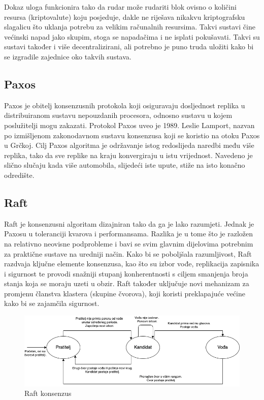\documentclass[times, utf8, diplomski]{fer}
\begin{document}
Dokaz uloga funkcionira tako da rudar može rudariti blok ovisno o količini resursa (kriptovalute) koju posjeduje, dakle ne riješava nikakvu kriptografsku slagalicu što uklanja potrebu za velikim računalnih resursima. Takvi sustavi čine većinski napad jako skupim, stoga se napadačima i ne isplati pokušavati. Takvi su sustavi također i više decentralizirani, ali potrebno je puno truda uložiti kako bi se izgradile zajednice oko takvih sustava.

\subsection{Paxos}

Paxos je obitelj konsenzusnih protokola koji osiguravaju dosljednost replika u distribuiranom sustavu nepouzdanih procesora, odnosno sustavu u kojem poslužitelji mogu zakazati. Protokol Paxos uveo je 1989. Leslie Lamport, nazvan po izmišljenom zakonodavnom sustavu konsenzusa koji se koristio na otoku Paxos u Grčkoj. Cilj Paxos algoritma je održavanje istog redoslijeda naredbi među više replika, tako da sve replike na kraju konvergiraju u istu vrijednost. Navedeno je slično slučaju kada više automobila, slijedeći iste upute, stiže na isto konačno odredište. \cite{lamport2001paxos}

\subsection{Raft}
\label{sec:raft}
Raft je konsenzusni algoritam dizajniran tako da ga je lako razumjeti. Jednak je Paxosu u toleranciji kvarova i performansama. Razlika je u tome što je razložen na relativno neovisne podprobleme i bavi se svim glavnim dijelovima potrebnim za praktične sustave na uredniji način. Kako bi se poboljšala razumljivost, Raft razdvaja ključne elemente konsenzusa, kao što su izbor vođe, replikacija zapisnika i sigurnost te provodi snažniji stupanj konherentnosti s ciljem smanjenja broja stanja koja se moraju uzeti u obzir. Raft također uključuje novi mehanizam za promjenu članstva klastera (skupine čvorova), koji koristi preklapajuće većine kako bi se zajamčila sigurnost. \cite{raft}

\begin{figure}[htb]
\centering
\includegraphics[width=12cm]{imgs/Raft.png}
\caption{Raft konsenzus}
\label{fig:raft}
\end{figure}
\end{document}
